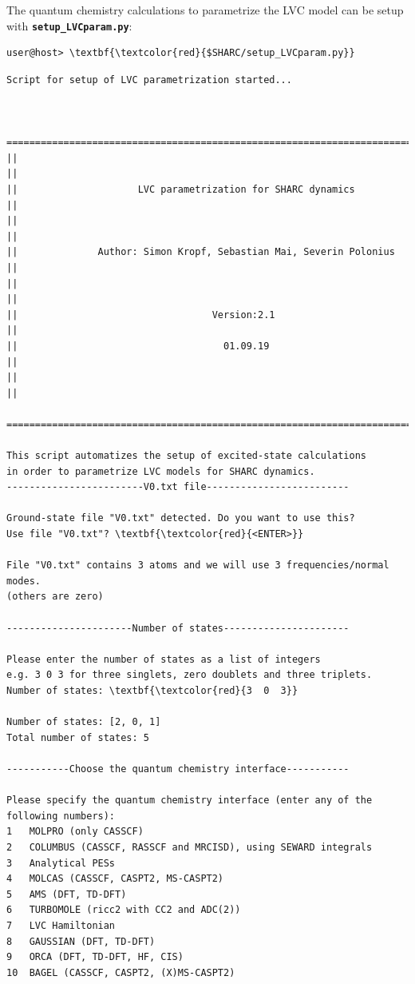 \documentclass[a4paper,11pt,DIV=15,openany]{scrbook}
\newcommand{\ttt}[1]{\textbf{\texttt{#1}}}
\begin{document}
The quantum chemistry calculations to parametrize the LVC model can be setup with \ttt{setup\_LVCparam.py}:
\begin{Verbatim}[commandchars=\\\{\}]
user@host> \textbf{\textcolor{red}{$SHARC/setup_LVCparam.py}}
\end{Verbatim}


\begin{oframed}
\footnotesize\begin{Verbatim}[commandchars=\\\{\}]
  Script for setup of LVC parametrization started...


  ================================================================================
||                                                                                ||
||                     LVC parametrization for SHARC dynamics                     ||
||                                                                                ||
||              Author: Simon Kropf, Sebastian Mai, Severin Polonius              ||
||                                                                                ||
||                                  Version:2.1                                   ||
||                                    01.09.19                                    ||
||                                                                                ||
  ================================================================================

This script automatizes the setup of excited-state calculations
in order to parametrize LVC models for SHARC dynamics.
------------------------V0.txt file-------------------------

Ground-state file "V0.txt" detected. Do you want to use this?
Use file "V0.txt"? \textbf{\textcolor{red}{<ENTER>}}

File "V0.txt" contains 3 atoms and we will use 3 frequencies/normal modes.
(others are zero)

----------------------Number of states----------------------

Please enter the number of states as a list of integers
e.g. 3 0 3 for three singlets, zero doublets and three triplets.
Number of states: \textbf{\textcolor{red}{3  0  3}}

Number of states: [2, 0, 1]
Total number of states: 5

-----------Choose the quantum chemistry interface-----------

Please specify the quantum chemistry interface (enter any of the following numbers):
1	MOLPRO (only CASSCF)
2	COLUMBUS (CASSCF, RASSCF and MRCISD), using SEWARD integrals
3	Analytical PESs
4	MOLCAS (CASSCF, CASPT2, MS-CASPT2)
5	AMS (DFT, TD-DFT)
6	TURBOMOLE (ricc2 with CC2 and ADC(2))
7	LVC Hamiltonian
8	GAUSSIAN (DFT, TD-DFT)
9	ORCA (DFT, TD-DFT, HF, CIS)
10	BAGEL (CASSCF, CASPT2, (X)MS-CASPT2)


\end{Verbatim}
\end{oframed}
\end{document}
